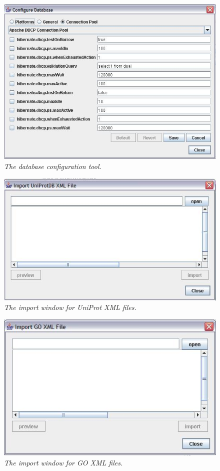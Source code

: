 \begin{figure}[htp]
\centering
\includegraphics[scale=1.0]{Images/hibernateProps.jpg}
\caption{\small \sl The database configuration tool.}
\end{figure}

\begin{figure}[htp]
\centering
\includegraphics[scale=1.0]{Images/uniprotImport.jpg}
\caption{\small \sl The import window for UniProt XML files.}
\end{figure}

\begin{figure}[htp]
\centering
\includegraphics[scale=1.0]{Images/goImport.jpg}
\caption{\small \sl The import window for GO XML files.}
\end{figure}

